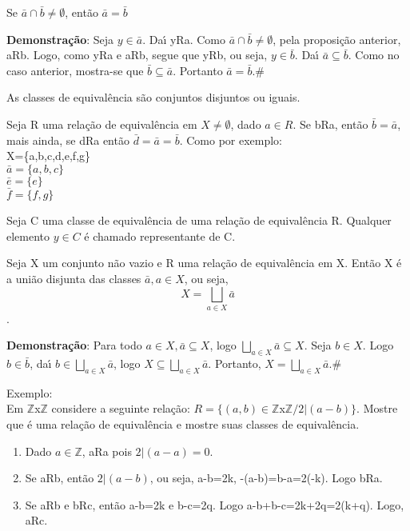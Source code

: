 \begin{proposicao} Se  $\bar{a}\cap\bar{b}\neq\emptyset$, ent{\~a}o $\bar{a}=\bar{b}$\end{proposicao}

\textbf{Demonstra{\c c}{\~a}o}: Seja $y\in \bar{a}$. Da{\'\i} yRa. Como $\bar{a}\cap\bar{b}\neq\emptyset$, pela proposi{\c c}{\~a}o anterior, aRb. Logo, como yRa e aRb, segue que yRb, ou seja, $y\in\bar{b}$. Da{\'\i} $\bar{a}\subseteq\bar{b}$. Como no caso anterior, mostra-se que $\bar{b}\subseteq\bar{a}$. Portanto $\bar{a}=\bar{b}$.\#

\begin{corolario} As classes de equival{\^e}ncia s{\~a}o conjuntos disjuntos ou iguais.\end{corolario}

Seja R uma rela{\c c}{\~a}o de equival{\^e}ncia em $X\neq\emptyset$, dado $a\in R$. Se bRa, ent{\~a}o $\bar{b}=\bar{a}$, mais ainda, se dRa ent{\~a}o $\bar{d}=\bar{a}=\bar{b}$. Como por exemplo:\\
X=\{a,b,c,d,e,f,g\}\\
$\bar{a}=\{a,b,c\}$\\
$\bar{e}=\{e\}$\\
$\bar{f}=\{f,g\}$

\begin{definicao} Seja C uma classe de equival{\^e}ncia de uma rela{\c c}{\~a}o de equival{\^e}ncia R. Qualquer elemento $y\in C$ {\'e} chamado representante de C.\end{definicao}

\begin{proposicao} Seja X um conjunto n{\~a}o vazio e R uma rela{\c c}{\~a}o de equival{\^e}ncia em X. Ent{\~a}o X {\'e} a uni{\~a}o disjunta das classes $\bar{a}, a\in X$, ou seja, \[X=\displaystyle\bigsqcup_{a\in X}\bar{a}\].\end{proposicao}

\textbf{Demonstra{\c c}{\~a}o}: Para todo $a\in X, \bar{a}\subseteq X$, logo $\displaystyle\bigsqcup_{a\in X}\bar{a}\subseteq X$. Seja $b\in X$. Logo $b\in\bar{b}$, da{\'\i} $b\in \displaystyle\bigsqcup_{a\in X}\bar{a}$, logo $X\subseteq\displaystyle\bigsqcup_{a\in X}\bar{a}$. Portanto, $X=\displaystyle\bigsqcup_{a\in X}\bar{a}$.\#

Exemplo:\\
Em $\mathbb{Z}$x$\mathbb{Z}$ considere a seguinte rela{\c c}{\~a}o: $R=\{(a,b)\in \mathbb{Z}$x$\mathbb{Z}/2|(a-b)\}$. Mostre que {\'e} uma rela{\c c}{\~a}o de equival{\^e}ncia e mostre suas classes de equival{\^e}ncia.
\begin{enumerate}
\item Dado $a\in \mathbb{Z}$, aRa pois $2|(a-a)=0$.
\item Se aRb, ent{\~a}o $2|(a-b)$, ou seja, a-b=2k, -(a-b)=b-a=2(-k). Logo bRa.
\item Se aRb e bRc, ent{\~a}o a-b=2k e b-c=2q. Logo a-b+b-c=2k+2q=2(k+q). Logo, aRc.

\end{enumerate}

